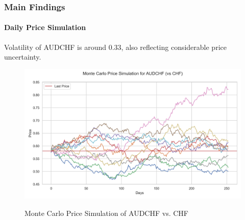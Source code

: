 \documentclass[10pt]{beamer}
\begin{document}
\begin{frame}
\frametitle{Main Findings}
\framesubtitle{Daily Price Simulation}
Volatility of AUDCHF is around 0.33, also reflecting considerable price uncertainty.
\begin{figure}[h]
    \centering \includegraphics[width=0.9\linewidth]{../../reports/figures/monte_carlo_price_simulation_AUDCHF_vs_CHF.png}    \label{fig:monte_carlo_price_simulation_AUDCHF_vs_CHF}
    \caption{Monte Carlo Price Simulation of AUDCHF vs. CHF}
\end{figure}
\end{frame}
\end{document}
